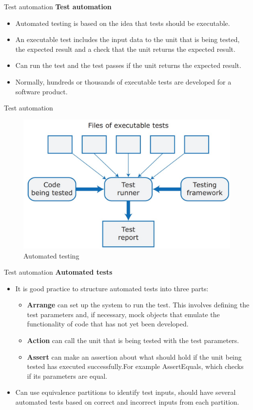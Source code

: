 \documentclass{beamer}
\begin{document}
\begin{frame}{Test automation}
	\textbf{Test automation}
	\begin{itemize}
		\item Automated testing is based on the idea that tests should be executable. 
		\item An executable test includes the input data to the unit that is being tested, the expected result and a check that the unit returns the expected result. 
		\item Can run the test and the test passes if the unit returns the expected result. 
		\item Normally, hundreds or thousands of executable tests are developed for a software product.
		
	\end{itemize}
\end{frame}
\begin{frame}{Test automation}
	\begin{figure}
	\includegraphics[scale=.4]{img/m3_28}
		\caption{Automated testing}
\end{figure}
\end{frame}
\begin{frame}{Test automation}
\textbf{Automated tests}
\begin{itemize}
	\item It is good practice to structure automated tests into three parts:
	\begin{itemize}
		\item \textbf{Arrange} can set up the system to run the test. This involves defining the test parameters and, if necessary, mock objects that emulate the functionality of code that has not yet been developed.
	\item \textbf{Action} can call the unit that is being tested with the test parameters. 
		\item \textbf{Assert} can make an assertion about what should hold if the unit being tested has executed successfully.For example AssertEquals, which checks if its parameters are equal.
	\end{itemize}
\item Can use equivalence partitions to identify test inputs, should have several automated tests based on correct and incorrect inputs from each partition. 

\end{itemize}
\end{frame}
\end{document}
